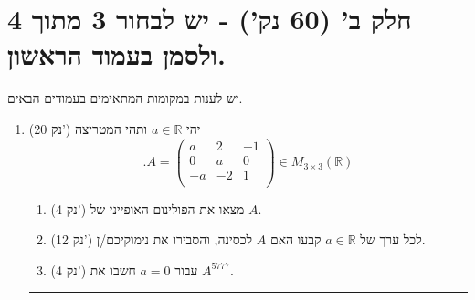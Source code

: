 \documentclass[12pt, a4paper]{article}
\newcommand{\rr}{\mathbb{R}}
\newcommand{\points}[1]{(#1 נק') }
\begin{document}
 \pagebreak

\section*{חלק ב' (60 נק') - יש לבחור 3 מתוך 4 ולסמן בעמוד הראשון.}
יש לענות במקומות המתאימים בעמודים הבאים.
\begin{enumerate}
\newcommand{\firstQ}{
\item\points{20}
יהי
$a\in\rr$
ותהי המטריצה
$$.A=
\begin{pmatrix}
a&2&-1\\
0&a&0\\
-a&-2&1\\
\end{pmatrix}\in
M_{3\times3}(\rr)$$
\begin{enumerate}
\item\points{4}
מצאו את הפולינום האופייני של
$A$.
\item
\points{12}
לכל ערך של
$a\in\rr$
קבעו האם 
$A$
לכסינה, והסבירו את נימוקיכם/ן.
\item\points{4}
עבור
$a=0$
חשבו את
$A^{5777}$.
\end{enumerate}

}
\firstQ
\noindent\rule{\textwidth-30pt}{0.4pt}


\end{enumerate}
\end{document}
